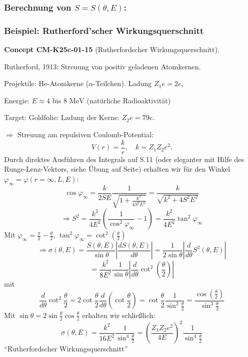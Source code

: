 \documentclass[10pt, letterpaper]{article}
\newcommand{\CustomHeading}[3]{%
  \par\medskip\noindent%
  \textbf{#1 #2} \textnormal{(#3)}.\enskip%
}
\newenvironment{CONC}[2]{\begin{unitbox}\CustomHeading{Concept}{#1}{#2}}{\end{unitbox}}
\begin{document}
\subsubsection{Berechnung von $S=S(\theta,E)$:}

\begin{center}
\end{center}





\subsubsection{Beispiel: Rutherford'scher Wirkungsquerschnitt}

\begin{CONC}{CM-K25c-01-15}{Rutherfordscher Wirkungsquerschnitt}
Rutherford, 1913: Streuung von positiv geladenen Atomkernen.

Projektile: He-Atomkerne ($\alpha$-Teilchen). Ladung $Z_1e=2e$,

Energie: $E \approx 4$ bis $8\text{ MeV}$ (natürliche Radioaktivität)

Target: Goldfolie: Ladung der Kerne: $Z_2e=79e$.

$\Rightarrow$ Streuung am repulsiven Coulomb-Potential:
\[ V(r) = \frac{k}{r}, \quad k = Z_1Z_2e^2. \]
Durch direktes Ausführen des Integrals auf S.11 (oder eleganter mit Hilfe des Runge-Lenz-Vektors, siehe Übung auf Seite) erhalten wir für den Winkel $\varphi_\infty = \varphi(r=\infty,L,E)$:
\[ \cos\varphi_\infty = \frac{k}{2SE}\frac{1}{\sqrt{1+\frac{k^2}{4S^2E^2}}} = \frac{k}{\sqrt{k^2+4S^2E^2}} \]
\[ \Rightarrow S^2 = \frac{k^2}{4E^2}\left(\frac{1}{\cos^2\varphi_\infty}-1\right) = \frac{k^2}{4E^2}\tan^2\varphi_\infty \]
Mit $\varphi_\infty = \frac{\pi}{2} - \frac{\theta}{2}$, $\tan^2\varphi_\infty = \cot^2(\frac{\theta}{2})$
\[ \Rightarrow \sigma(\theta,E) = \frac{S(\theta,E)}{\sin\theta}\left|\frac{dS(\theta,E)}{d\theta}\right| = \frac{1}{2\sin\theta}\left|\frac{d}{d\theta}S^2(\theta,E)\right| \]
\[ = \frac{k^2}{8E^2}\frac{1}{\sin\theta}\left|\frac{d}{d\theta}\cot^2(\frac{\theta}{2})\right| \]
mit 
$$\frac{d}{d\theta}\cot^2\frac{\theta}{2} = 2\cot\frac{\theta}{2}\frac{d}{d\theta}(\cot\frac{\theta}{2}) = \cot\frac{\theta}{2}\frac{1}{\sin^2\frac{\theta}{2}} = \frac{\cos(\frac{\theta}{2})}{\sin^3\frac{\theta}{2}}$$
Mit $\sin\theta = 2\sin\frac{\theta}{2}\cos\frac{\theta}{2}$ erhalten wir schließlich:
\[\sigma(\theta,E) = \frac{k^2}{16E^2}\frac{1}{\sin^4\frac{\theta}{2}} = \left(\frac{Z_1Z_2e^2}{4E}\right)^2\frac{1}{\sin^4\frac{\theta}{2}}\]
``Rutherfordscher Wirkungsquerschnitt''
\end{CONC}
\end{document}
